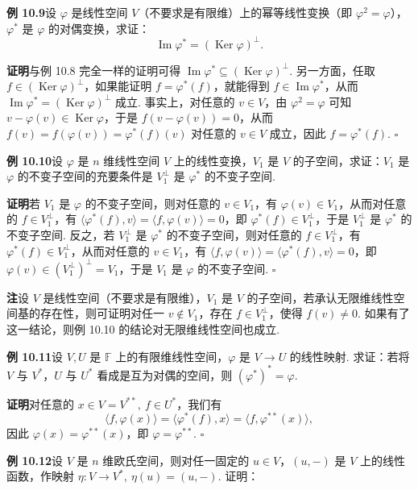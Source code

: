 \documentclass[UTF8, 12pt, fontset=fandol, oneside]{ctexart}
\begin{document}
\noindent\textbf{例 10.9}\quad 设 $\varphi$ 是线性空间 $V$（不要求是有限维）上的幂等线性变换（即 $\varphi^2=\varphi$），$\varphi^*$ 是 $\varphi$ 的对偶变换，求证：
\[
\operatorname{Im}\varphi^*=(\operatorname{Ker}\varphi)^\perp.
\]

\noindent\textbf{证明}\quad 与例 10.8 完全一样的证明可得 $\operatorname{Im}\varphi^*\subseteq(\operatorname{Ker}\varphi)^\perp$. 另一方面，任取 $f\in(\operatorname{Ker}\varphi)^\perp$，如果能证明 $f=\varphi^*(f)$，就能得到 $f\in\operatorname{Im}\varphi^*$，从而 $\operatorname{Im}\varphi^*=(\operatorname{Ker}\varphi)^\perp$ 成立. 事实上，对任意的 $v\in V$，由 $\varphi^2=\varphi$ 可知 $v-\varphi(v)\in\operatorname{Ker}\varphi$，于是 $f(v-\varphi(v))=0$，从而 $f(v)=f(\varphi(v))=\varphi^*(f)(v)$ 对任意的 $v\in V$ 成立，因此 $f=\varphi^*(f)$. $\square$

\noindent\textbf{例 10.10}\quad 设 $\varphi$ 是 $n$ 维线性空间 $V$ 上的线性变换，$V_1$ 是 $V$ 的子空间，求证：$V_1$ 是 $\varphi$ 的不变子空间的充要条件是 $V_1^\perp$ 是 $\varphi^*$ 的不变子空间.

\noindent\textbf{证明}\quad 若 $V_1$ 是 $\varphi$ 的不变子空间，则对任意的 $v\in V_1$，有 $\varphi(v)\in V_1$，从而对任意的 $f\in V_1^\perp$，有 $\langle\varphi^*(f),v\rangle=\langle f,\varphi(v)\rangle=0$，即 $\varphi^*(f)\in V_1^\perp$，于是 $V_1^\perp$ 是 $\varphi^*$ 的不变子空间. 反之，若 $V_1^\perp$ 是 $\varphi^*$ 的不变子空间，则对任意的 $f\in V_1^\perp$，有 $\varphi^*(f)\in V_1^\perp$，从而对任意的 $v\in V_1$，有 $\langle f,\varphi(v)\rangle=\langle\varphi^*(f),v\rangle=0$，即 $\varphi(v)\in(V_1^\perp)^\perp=V_1$，于是 $V_1$ 是 $\varphi$ 的不变子空间. $\square$

\noindent\textbf{注}\quad 设 $V$ 是线性空间（不要求是有限维），$V_1$ 是 $V$ 的子空间，若承认无限维线性空间基的存在性，则可证明对任一 $v\notin V_1$，存在 $f\in V_1^\perp$，使得 $f(v)\ne0$. 如果有了这一结论，则例 10.10 的结论对无限维线性空间也成立.

\noindent\textbf{例 10.11}\quad 设 $V,U$ 是 $\mathbb{F}$ 上的有限维线性空间，$\varphi$ 是 $V\to U$ 的线性映射. 求证：若将 $V$ 与 $V^*$，$U$ 与 $U^*$ 看成是互为对偶的空间，则 $(\varphi^*)^*=\varphi$.

\noindent\textbf{证明}\quad 对任意的 $x\in V=V^{**},\ f\in U^*$，我们有
\[
\langle f,\varphi(x)\rangle=\langle\varphi^*(f),x\rangle=\langle f,\varphi^{**}(x)\rangle,
\]
因此 $\varphi(x)=\varphi^{**}(x)$，即 $\varphi=\varphi^{**}$. $\square$

\noindent\textbf{例 10.12}\quad 设 $V$ 是 $n$ 维欧氏空间，则对任一固定的 $u\in V$，$(u,-)$ 是 $V$ 上的线性函数，作映射 $\eta:V\to V^*,\ \eta(u)=(u,-)$. 证明：
\end{document}
